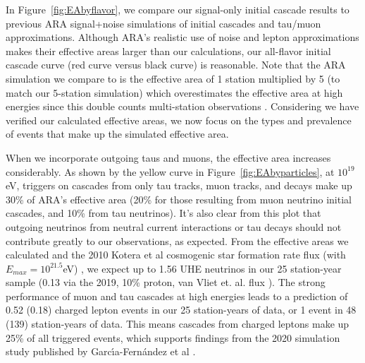     In Figure~\ref{fig:EAbyflavor}, we compare our signal-only initial cascade results to previous ARA signal+noise simulations of initial cascades and tau/muon approximations.
    Although ARA's realistic use of noise and lepton approximations makes their effective areas larger than our calculations, our all-flavor initial cascade curve (red curve versus black curve) is reasonable.
    Note that the ARA simulation we compare to is the effective area of 1 station multiplied by 5 (to match our 5-station simulation) which overestimates the effective area at high energies since this double counts multi-station observations \citep{ara_testbed}.
    Considering we have verified our calculated effective areas, we now focus on the types and prevalence of events that make up the simulated effective area.
    
    When we incorporate outgoing taus and muons, the effective area increases considerably.
    As shown by the yellow curve in Figure~\ref{fig:EAbyparticles}, at $10^{19}$ eV, triggers on cascades from only tau tracks, muon tracks, and decays make up 30\% of ARA's effective area (20\% for those resulting from muon neutrino initial cascades, and 10\% from tau neutrinos).
    It's also clear from this plot that outgoing neutrinos from neutral current interactions or tau decays should not contribute greatly to our observations, as expected.
    From the effective areas we calculated and the 2010 Kotera et al cosmogenic star formation rate flux (with $E_{max}=10^{21.5}$eV) \citep{flux-kotera}, we expect up to 1.56 UHE neutrinos in our 25 station-year sample (0.13 via the 2019, 10\% proton, van Vliet et. al. flux \citep{flux_vanvliet}).
    The strong performance of muon and tau cascades at high energies leads to a prediction of 0.52 (0.18) charged lepton events in our 25 station-years of data, or 1 event in 48 (139) station-years of data.
    This means cascades from charged leptons make up 25\% of all triggered events, which supports findings from the 2020 simulation study published by Garc{\'\i}a-Fern{\'a}ndez et al \citep{secondaries_garciafernandez}.
    
